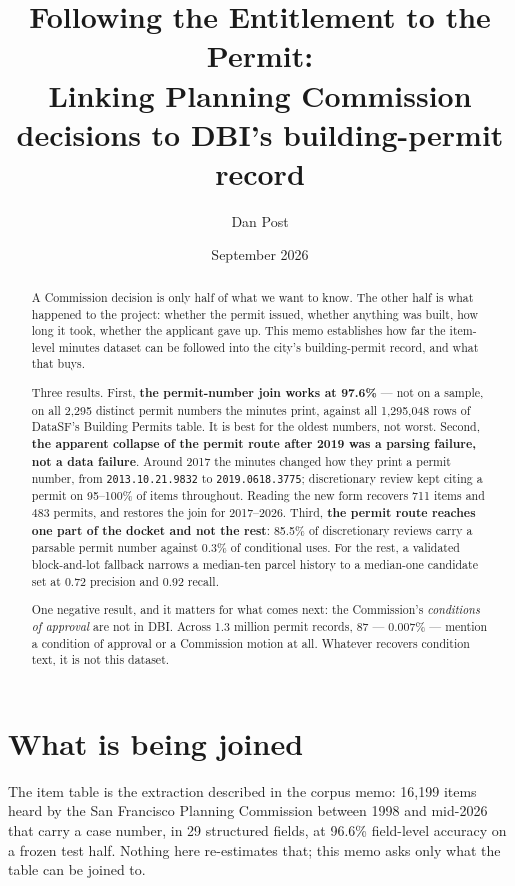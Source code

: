 \documentclass[11pt]{article}
\title{Following the Entitlement to the Permit:\\
\large Linking Planning Commission decisions to DBI's building-permit record}
\author{Dan Post}
\date{September 2026}
\begin{document}
\maketitle

\begin{abstract}
\noindent
A Commission decision is only half of what we want to know. The other half is what happened
to the project: whether the permit issued, whether anything was built, how long it took,
whether the applicant gave up. This memo establishes how far the item-level minutes dataset
can be followed into the city's building-permit record, and what that buys.

\medskip\noindent
Three results. First, \textbf{the permit-number join works at 97.6\%} --- not on a sample, on
all 2{,}295 distinct permit numbers the minutes print, against all 1{,}295{,}048 rows of
DataSF's Building Permits table. It is best for the oldest numbers, not worst. Second,
\textbf{the apparent collapse of the permit route after 2019 was a parsing failure, not a
data failure}. Around 2017 the minutes changed how they print a permit number, from
\texttt{2013.10.21.9832} to \texttt{2019.0618.3775}; discretionary review kept citing a
permit on 95--100\% of items throughout. Reading the new form recovers 711 items and 483
permits, and restores the join for 2017--2026. Third, \textbf{the permit route reaches one
part of the docket and not the rest}: 85.5\% of discretionary reviews carry a parsable permit
number against 0.3\% of conditional uses. For the rest, a validated block-and-lot fallback
narrows a median-ten parcel history to a median-one candidate set at 0.72 precision and 0.92
recall.

\medskip\noindent
One negative result, and it matters for what comes next: the Commission's \emph{conditions of
approval} are not in DBI. Across 1.3 million permit records, 87 --- 0.007\% --- mention a
condition of approval or a Commission motion at all. Whatever recovers condition text, it is
not this dataset.
\end{abstract}

\tableofcontents
\newpage

\section{What is being joined}

The item table is the extraction described in the corpus memo: 16{,}199 items heard by the
San Francisco Planning Commission between 1998 and mid-2026 that carry a case number, in 29
structured fields, at 96.6\% field-level accuracy on a frozen test half. Nothing here
re-estimates that; this memo asks only what the table can be joined to.
\end{document}
